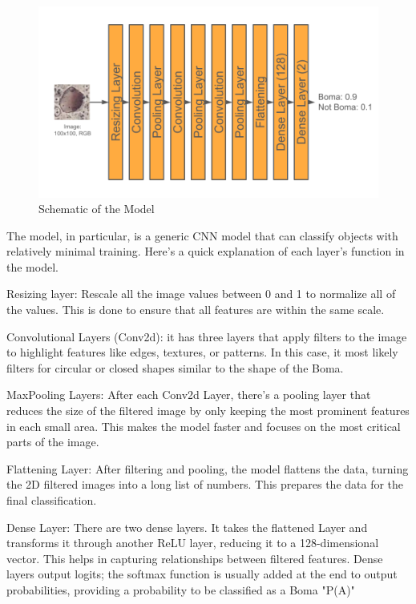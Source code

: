 \documentclass[10pt]{article}
\begin{document}
\begin{figure} [H] %
    \centering
    \includegraphics[width=1\linewidth]{images/Model Shape.png}
    \caption{Schematic of the Model}
    \label{fig:model_shape}
\end{figure}

The model, in particular, is a generic CNN model that can classify objects with relatively minimal training. Here's a quick explanation of each layer's function in the model.

Resizing layer: Rescale all the image values between 0 and 1 to normalize all of the values. This is done to ensure that all features are within the same scale.

Convolutional Layers (Conv2d): it has three layers that apply filters to the image to highlight features like edges, textures, or patterns. In this case, it most likely filters for circular or closed shapes similar to the shape of the Boma.

MaxPooling Layers: After each Conv2d Layer, there's a pooling layer that reduces the size of the filtered image by only keeping the most prominent features in each small area. This makes the model faster and focuses on the most critical parts of the image.

Flattening Layer: After filtering and pooling, the model flattens the data, turning the 2D filtered images into a long list of numbers. This prepares the data for the final classification.

Dense Layer: There are two dense layers. It takes the flattened Layer and transforms it through another ReLU layer, reducing it to a 128-dimensional vector. This helps in capturing relationships between filtered features. Dense layers output logits; the softmax function is usually added at the end to output probabilities, providing a probability to be classified as a Boma "P(A)"
\end{document}
